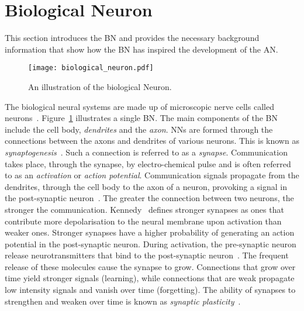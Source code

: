 \section{Biological Neuron}\label{sec:anns:bn}

This section introduces the \acs{BN} and provides the necessary background information that show how the \acs{BN} has inspired the development of the \acs{AN}.

\begin{figure}[htpb]
      \centering
      \texttt{[image: biological\_neuron.pdf]}
      \caption[The biological Neuron]{An illustration of the biological Neuron.}
      \label{fig:biological_neuron}
\end{figure}

\noindent
The biological neural systems are made up of microscopic nerve cells called neurons~\cite{ref:jain:1996}. Figure~\ref{fig:biological_neuron} illustrates a single \acs{BN}. The main components of the \acs{BN} include the cell body, \textit{dendrites} and the \textit{axon}. \Acp{NN} are formed through the connections between the axons and dendrites of various neurons. This is known as \textit{synaptogenesis}~\cite{ref:huttenlocher:1997}. Such a connection is referred to as a \textit{synapse}. Communication takes place, through the synapse, by electro-chemical pulse and is often referred to as an \textit{activation} or \textit{action potential}.  Communication signals propagate from the dendrites, through the cell body to the axon of a neuron, provoking a signal in the post-synaptic neuron~\cite{ref:engelbrecht:2007}. The greater the connection between two neurons, the stronger the communication.  Kennedy~\cite{ref:kennedy:2016} defines stronger synapses as ones that contribute more depolarisation to the neural membrane upon activation than weaker ones. Stronger synapses have a higher probability of generating an action potential in the post-synaptic neuron. During activation, the pre-synaptic neuron release neurotransmitters that bind to the post-synaptic neuron~\cite{ref:khanacademy:synapse}. The frequent release of these molecules cause the synapse to grow. Connections that grow over time yield stronger signals (learning), while connections that are weak propagate low intensity signals and vanish over time (forgetting). The ability of synapses to strengthen and weaken over time is known as \textit{synaptic plasticity}~\cite{ref:huttenlocher:1997}.

